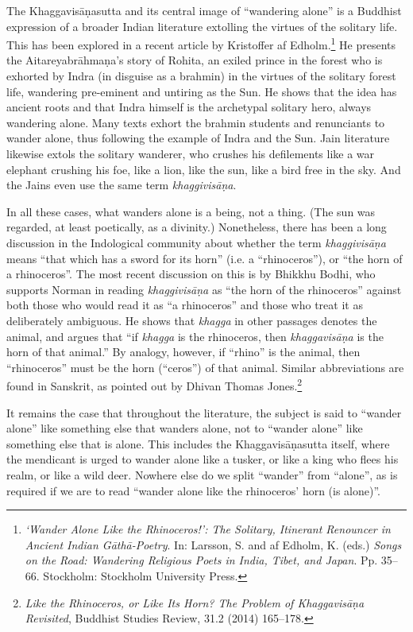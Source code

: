 \documentclass[12pt,openany]{book}%
\begin{document}
The \textsanskrit{Khaggavisāṇasutta} and its central image of “wandering alone” is a Buddhist expression of a broader Indian literature extolling the virtues of the solitary life. This has been explored in a recent article by Kristoffer af Edholm.\footnote{\textit{‘Wander Alone Like the Rhinoceros!’: The Solitary, Itinerant Renouncer in Ancient Indian \textsanskrit{Gāthā}-Poetry}. In: Larsson, S. and af Edholm, K. (eds.) \textit{Songs on the Road: Wandering Religious Poets in India, Tibet, and Japan}. Pp. 35–66. Stockholm: Stockholm University Press. } He presents the \textsanskrit{Aitareyabrāhmaṇa}’s story of Rohita, an exiled prince in the forest who is exhorted by Indra (in disguise as a brahmin) in the virtues of the solitary forest life, wandering pre-eminent and untiring as the Sun. He shows that the idea has ancient roots and that Indra himself is the archetypal solitary hero, always wandering alone. Many texts exhort the brahmin students and renunciants to wander alone, thus following the example of Indra and the Sun. Jain literature likewise extols the solitary wanderer, who crushes his defilements like a war elephant crushing his foe, like a lion, like the sun, like a bird free in the sky. And the Jains even use the same term \textit{\textsanskrit{khaggivisāṇa}}.

In all these cases, what wanders alone is a being, not a thing. (The sun was regarded, at least poetically, as a divinity.) Nonetheless, there has been a long discussion in the Indological community about whether the term \textit{\textsanskrit{khaggivisāṇa}} means “that which has a sword for its horn” (i.e. a “rhinoceros”), or “the horn of a rhinoceros”. The most recent discussion on this is by Bhikkhu Bodhi, who supports Norman in reading \textit{\textsanskrit{khaggivisāṇa}} as “the horn of the rhinoceros” against both those who would read it as “a rhinoceros” and those who treat it as deliberately ambiguous. He shows that \textit{khagga} in other passages denotes the animal, and argues that “if \textit{khagga} is the rhinoceros, then \textit{\textsanskrit{khaggavisāṇa}} is the horn of that animal.” By analogy, however, if “rhino” is the animal, then “rhinoceros” must be the horn (“ceros”) of that animal. Similar abbreviations are found in Sanskrit, as pointed out by Dhivan Thomas Jones.\footnote{\textit{Like the Rhinoceros, or Like Its Horn? The Problem of \textsanskrit{Khaggavisāṇa} Revisited}, Buddhist Studies Review, 31.2 (2014) 165–178. }

It remains the case that throughout the literature, the subject is said to “wander alone” like something else that wanders alone, not to “wander alone” like something else that is alone. This includes the \textsanskrit{Khaggavisāṇasutta} itself, where the mendicant is urged to wander alone like a tusker, or like a king who flees his realm, or like a wild deer. Nowhere else do we split “wander” from “alone”, as is required if we are to read “wander alone like the rhinoceros’ horn (is alone)”.
\end{document}
